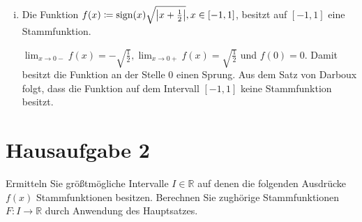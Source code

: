 \documentclass{article}
\begin{document}
\begin{enumerate}[(i)]
\newpage
\item Die Funktion $f(x) \coloneqq \text{sign}(x) \sqrt{\abs{x + \frac{1}{2}}}, x \in [-1,1]$, besitzt
  auf $[-1,1]$ eine Stammfunktion.

  \label{dia:1.2}

  $\lim_{x \to 0-} f(x) = - \sqrt{\frac{1}{2}}, \lim_{x \to 0+} f(x) = \sqrt{\frac{1}{2}}$ und $f(0) = 0$.
  Damit besitzt die Funktion an der Stelle $0$ einen Sprung.
  Aus dem Satz von Darboux folgt, dass die Funktion auf dem Intervall $[-1, 1]$ keine Stammfunktion besitzt.
\end{enumerate}

\section*{Hausaufgabe 2}

Ermitteln Sie größtmögliche Intervalle $I \in \mathbb{R}$ auf denen die folgenden Ausdrücke
$f(x)$ Stammfunktionen besitzen.
Berechnen Sie zughörige Stammfunktionen $F \colon I \to \mathbb{R}$
durch Anwendung des Hauptsatzes.
\end{document}

